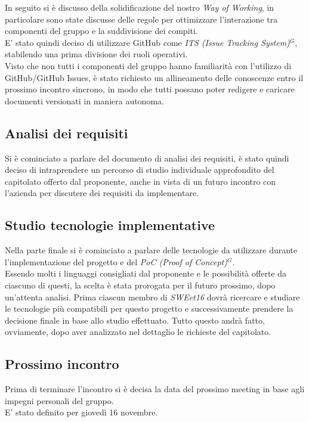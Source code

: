 \documentclass[a4paper, 11pt]{article}
\begin{document}
In seguito si è discusso della solidificazione del nostro \textit{Way of Working}, in particolare sono state discusse delle regole per ottimizzare l'interazione tra componenti del gruppo e la suddivisione dei compiti. \\
E' stato quindi deciso di utilizzare GitHub come \emph{ITS (Issue Tracking System)}$^{G}$, stabilendo una prima divisione dei ruoli operativi. \\
Visto che non tutti i componenti del gruppo hanno familiarità con l'utilizzo di GitHub/GitHub Issues, è stato richiesto un allineamento delle conoscenze entro il prossimo incontro sincrono, in modo che tutti possano poter redigere e caricare documenti versionati in maniera autonoma.

\subsection{Analisi dei requisiti}
Si è cominciato a parlare del documento di analisi dei requisiti, è stato quindi deciso di intraprendere un percorso di studio individuale approfondito del capitolato offerto dal proponente, anche in vista di un futuro incontro con l'azienda per discutere dei requisiti da implementare.

\subsection{Studio tecnologie implementative}

Nella parte finale si è cominciato a parlare delle tecnologie da utilizzare durante l'implementazione del progetto e del \emph{PoC (Proof of Concept)}$^{G}$. \\
Essendo molti i linguaggi consigliati dal proponente e le possibilità offerte da ciascuno di questi, la scelta è stata prorogata per il futuro prossimo, dopo un'attenta analisi.
Prima ciascun membro di \textit{SWEet16} dovrà ricercare e studiare le tecnologie più compatibili per questo progetto e successivamente prendere la decisione finale in base allo studio effettuato. Tutto questo andrà fatto, ovviamente, dopo aver analizzato nel dettaglio le richieste del capitolato.

\subsection{Prossimo incontro}
Prima di terminare l'incontro si è decisa la data del prossimo meeting in base agli impegni personali del gruppo. \\
E' stato definito per giovedì 16 novembre.
\end{document}
